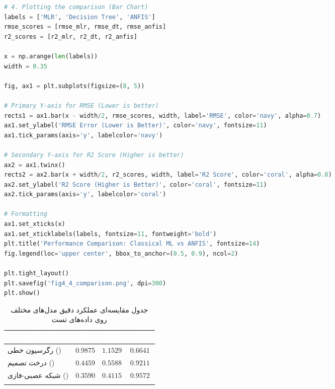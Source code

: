\documentclass{article}
\begin{document}
\begin{latin}
\begin{lstlisting}[language=Python, caption={Step 7: Comprehensive Evaluation and Visualization of Real Models}]
# 4. Plotting the comparison (Bar Chart)
labels = ['MLR', 'Decision Tree', 'ANFIS']
rmse_scores = [rmse_mlr, rmse_dt, rmse_anfis]
r2_scores = [r2_mlr, r2_dt, r2_anfis]

x = np.arange(len(labels))
width = 0.35

fig, ax1 = plt.subplots(figsize=(8, 5))

# Primary Y-axis for RMSE (Lower is better)
rects1 = ax1.bar(x - width/2, rmse_scores, width, label='RMSE', color='navy', alpha=0.7)
ax1.set_ylabel('RMSE Error (Lower is Better)', color='navy', fontsize=11)
ax1.tick_params(axis='y', labelcolor='navy')

# Secondary Y-axis for R2 Score (Higher is better)
ax2 = ax1.twinx()
rects2 = ax2.bar(x + width/2, r2_scores, width, label='R2 Score', color='coral', alpha=0.8)
ax2.set_ylabel('R2 Score (Higher is Better)', color='coral', fontsize=11)
ax2.tick_params(axis='y', labelcolor='coral')

# Formatting
ax1.set_xticks(x)
ax1.set_xticklabels(labels, fontsize=11, fontweight='bold')
plt.title('Performance Comparison: Classical ML vs ANFIS', fontsize=14)
fig.legend(loc='upper center', bbox_to_anchor=(0.5, 0.9), ncol=2)

plt.tight_layout()
plt.savefig('fig4_4_comparison.png', dpi=300)
plt.show()
	\end{lstlisting}
\end{latin}

\vspace{0.3cm}
\begin{table}[H]
	\centering
	\renewcommand{\arraystretch}{1.6}
	\begin{tabular}{!{\vrule width 1pt}l|c|c|c!{\vrule width 1pt}} 
		\textcolor{white}{\textbf{مدل پیش‌بینی ()}} & \textcolor{white}{\textbf{خطای }} & \textcolor{white}{\textbf{خطای }} & \textcolor{white}{\textbf{دقت ()}} \\
		\hline
		رگرسیون خطی () & $0.9875$ & $1.1529$ & $0.6641$ \\
		\hline
		درخت تصمیم () & $0.4459$ & $0.5588$ & $0.9211$ \\
		\hline
		شبکه عصبی-فازی () & $\mathbf{0.3590}$ & $\mathbf{0.4115}$ & $\mathbf{0.9572}$ \\
	\end{tabular}
	\caption{جدول مقایسه‌ای عملکرد دقیق مدل‌های مختلف روی داده‌های تست}
\end{table}
\end{document}
